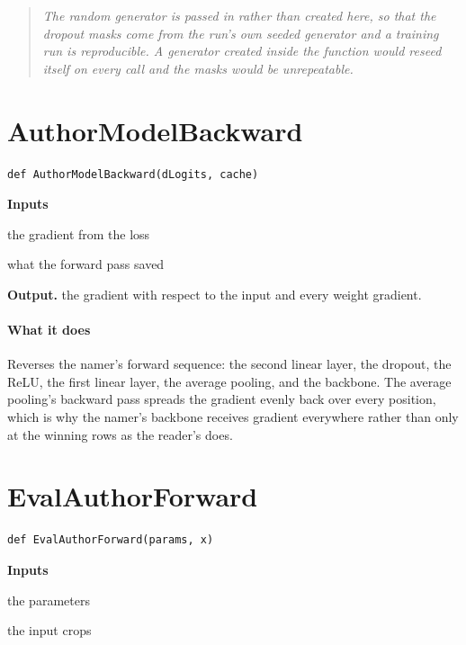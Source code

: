 \begin{quote}\small\itshape The random generator is passed in rather than created here, so that the dropout masks come from the run's own seeded generator and a training run is reproducible. A generator created inside the function would reseed itself on every call and the masks would be unrepeatable.\end{quote}

\section{AuthorModelBackward}
\begin{lstlisting}[style=sig]
def AuthorModelBackward(dLogits, cache)
\end{lstlisting}

\noindent\textbf{Inputs}
\begin{description}[leftmargin=2.2em,style=nextline,font=\normalfont\ttfamily]\setlength\itemsep{1pt}
  \item[{dLogits}] \normalfont the gradient from the loss
  \item[{cache}] \normalfont what the forward pass saved
\end{description}

\noindent\textbf{Output.} the gradient with respect to the input and every weight gradient.


\paragraph{What it does}
Reverses the namer's forward sequence: the second linear layer, the dropout, the ReLU, the first linear layer, the average pooling, and the backbone. The average pooling's backward pass spreads the gradient evenly back over every position, which is why the namer's backbone receives gradient everywhere rather than only at the winning rows as the reader's does.


\section{EvalAuthorForward}
\begin{lstlisting}[style=sig]
def EvalAuthorForward(params, x)
\end{lstlisting}

\noindent\textbf{Inputs}
\begin{description}[leftmargin=2.2em,style=nextline,font=\normalfont\ttfamily]\setlength\itemsep{1pt}
  \item[{params}] \normalfont the parameters
  \item[{x}] \normalfont the input crops
\end{description}

